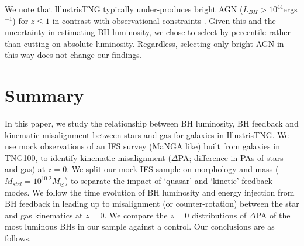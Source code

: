 \documentclass[fleqn,usenatbib]{mnras}
\begin{document}
We note that IllustrisTNG typically under-produces bright AGN ($L_{BH} > 10^{44}$ergs$^{-1}$) for $z \leq 1$ in contrast with observational constraints \citep[see][]{habouzit2019}. Given this and the uncertainty in estimating BH luminosity, we chose to select by percentile rather than cutting on absolute luminosity. Regardless, selecting only bright AGN in this way does not change our findings.

\section{Summary} \label{sec:conclusion}
In this paper, we study the relationship between BH luminosity, BH feedback and kinematic misalignment between stars and gas for galaxies in IllustrisTNG. We use mock observations of an IFS survey (MaNGA like) built from galaxies in TNG100, to identify kinematic misalignment ($\Delta$PA; difference in PAs of stars and gas) at $z=0$. We split our mock IFS sample on morphology and mass ($M_{stel} = 10^{10.2}M_{\odot}$) to separate the impact of `quasar' and `kinetic' feedback modes. We follow the time evolution of BH luminosity and energy injection from BH feedback in leading up to misalignment (or counter-rotation) between the star and gas kinematics at $z=0$. We compare the $z=0$ distributions of $\Delta$PA of the most luminous BHs in our sample against a control. Our conclusions are as follows.
\end{document}
